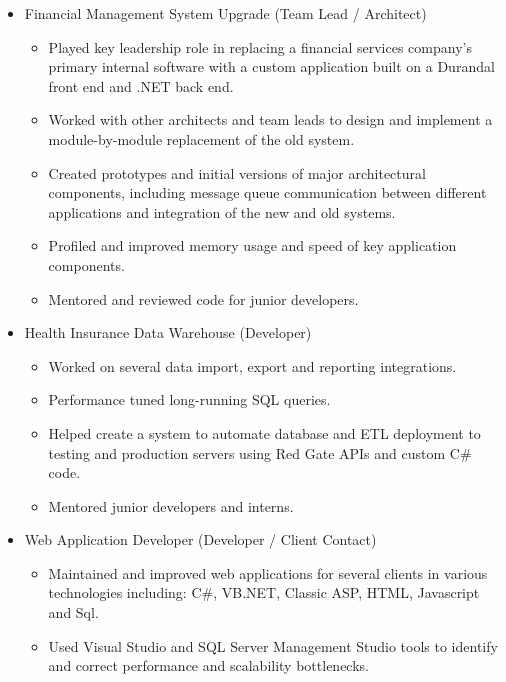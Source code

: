 \documentclass[12pt,letterpaper,sans]{moderncv}
\begin{document}
    \begin{itemize}[leftmargin=1.24in]
        \item Financial Management System Upgrade (Team Lead / Architect)
            \begin{itemize}
                \item Played key leadership role in replacing a financial services company's primary internal software with a custom application built on a Durandal front end and .NET back end.
                \item Worked with other architects and team leads to design and implement a module-by-module replacement of the old system.
                \item Created prototypes and initial versions of major architectural components, including message queue \mbox{communication} between different applications and integration of the new and old systems.
                \item Profiled and improved memory usage and speed of key application components.
                \item Mentored and reviewed code for junior developers.
            \end{itemize}
        \newpage
        \item Health Insurance Data Warehouse (Developer)
        	\begin{itemize}
	        	\item Worked on several data import, export and reporting integrations.
	        	\item Performance tuned long-running SQL queries.
	        	\item Helped create a system to automate database and ETL deployment to testing and production servers using Red Gate APIs and custom C\# code.
	        	\item Mentored junior developers and interns.
        	\end{itemize}
        \item Web Application Developer (Developer / Client Contact)
            \begin{itemize}
            	\item Maintained and improved web applications for several clients in various technologies including: C\#, VB.NET, Classic ASP, HTML, Javascript and Sql.
                \item Used Visual Studio and SQL Server Management Studio tools to identify and correct performance and scalability bottlenecks.
            \end{itemize}

\end{itemize}
\end{document}
